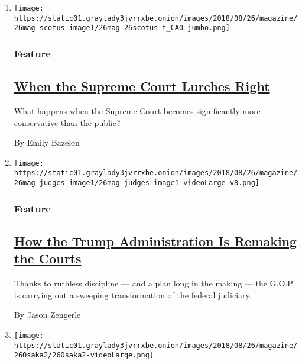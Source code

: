 \begin{enumerate}
\def\labelenumi{\arabic{enumi}.}
\item
  \texttt{[image: https://static01.graylady3jvrrxbe.onion/images/2018/08/26/magazine/26mag-scotus-image1/26mag-26scotus-t\_CA0-jumbo.png]}

  \hypertarget{feature}{%
  \subsubsection{Feature}\label{feature}}

  \hypertarget{when-the-supreme-court-lurches-right}{%
  \subsection{\texorpdfstring{\href{/2018/08/22/magazine/when-the-supreme-court-lurches-right.html}{When
  the Supreme Court Lurches
  Right}}{When the Supreme Court Lurches Right}}\label{when-the-supreme-court-lurches-right}}

  What happens when the Supreme Court becomes significantly more
  conservative than the public?

  By Emily Bazelon
\item
  \texttt{[image: https://static01.graylady3jvrrxbe.onion/images/2018/08/26/magazine/26mag-judges-image1/26mag-judges-image1-videoLarge-v8.png]}

  \hypertarget{feature-1}{%
  \subsubsection{Feature}\label{feature-1}}

  \hypertarget{how-the-trump-administration-is-remaking-the-courts}{%
  \subsection{\texorpdfstring{\href{/2018/08/22/magazine/trump-remaking-courts-judiciary.html}{How
  the Trump Administration Is Remaking the
  Courts}}{How the Trump Administration Is Remaking the Courts}}\label{how-the-trump-administration-is-remaking-the-courts}}

  Thanks to ruthless discipline --- and a plan long in the making ---
  the G.O.P is carrying out a sweeping transformation of the federal
  judiciary.

  By Jason Zengerle
\item
  \texttt{[image: https://static01.graylady3jvrrxbe.onion/images/2018/08/26/magazine/26Osaka2/26Osaka2-videoLarge.png]}


\end{enumerate}
